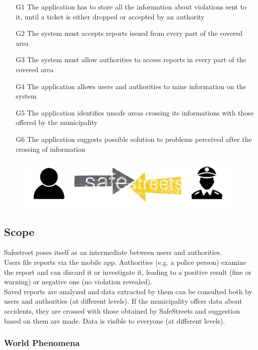 \begin{itemize}
    \item [G1]{The application has to store all the information about violations sent to it, until a ticket is either dropped or accepted by an authority}
    \item [G2]{The system must accepts reports issued from every part of the covered area }
    \item [G3]{The system must allow authorities to access reports in every part of the covered area}
    \item [G4]{The application allows users and authorities to mine information on the system}
    \item [G5]{The application identifies unsafe areas crossing its informations with those offered by the municipality}
    \item [G6]{The application suggests possible solution to problems perceived after the crossing of information}
\end{itemize}

\begin{figure}
    \includegraphics[width=\textwidth]{Images/Templates/icon-safestreets.PNG}
\end{figure}

\subsection{Scope}

Safestreet poses itself as an intermediate between users and authorities.\\
Users file reports via the mobile app. 
Authorities (e.g. a police person) examine the report and can discard it or 
investigate it, leading to a positive result (fine or warning) or negative 
one (no violation revealed).\\
Saved reports are analyzed and data extracted by them can be consulted 
both by users and authorities (at different levels).
If the municipality offers data about accidents, they are crossed with 
those obtained by SafeStreets and suggestion based on them are made. 
Data is visible to everyone (at different levels).

\subsubsection{World Phenomena}


